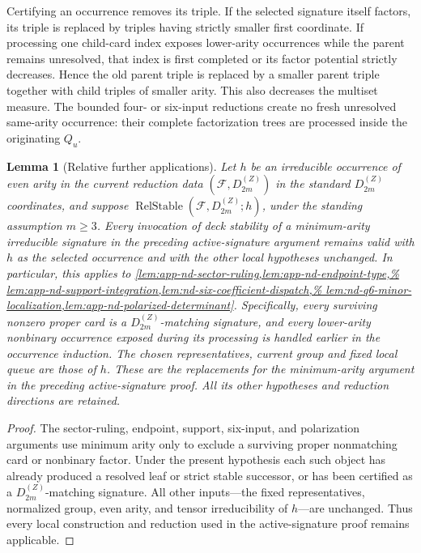 \documentclass[11pt,letterpaper,onecolumn]{article}
\theoremstyle{plain}
\newtheorem{lemma}[lemma]{Lemma}
\theoremstyle{definition}
\theoremstyle{remark}
\newcommand{\cF}{\mathcal F}
\newcommand{\DihZ}[1]{{D_{#1}^{(Z)}}}
\begin{document}
Certifying an occurrence removes its triple.  If the selected signature
itself factors, its triple is replaced by triples having strictly smaller
first coordinate.  If processing one child-card index exposes lower-arity
occurrences while the parent remains unresolved, that index is first completed
or its factor potential strictly decreases. Hence the old parent triple is
replaced by a smaller parent triple together with child triples of smaller
arity.  This also decreases the multiset measure.  The bounded four- or six-input reductions
create no fresh unresolved same-arity occurrence: their complete factorization trees are processed inside the originating \(Q_u\).

\begin{lemma}[Relative further applications]
\label{lem:nd-relative-reentry}
Let \(h\) be an irreducible occurrence of even arity in the current
reduction data \((\cF,\DihZ{2m})\) in the standard \(\DihZ{2m}\) coordinates, and suppose
\(\operatorname{RelStable}(\cF,\DihZ{2m};h)\), under the standing
assumption \(m\ge3\).  Every invocation of deck stability of a minimum-arity irreducible signature
in the preceding active-signature argument remains valid with \(h\) as the
selected occurrence and with the other local hypotheses unchanged.
In particular, this applies to
\cref{lem:app-nd-sector-ruling,lem:app-nd-endpoint-type,%
lem:app-nd-support-integration,lem:nd-six-coefficient-dispatch,%
lem:nd-q6-minor-localization,lem:app-nd-polarized-determinant}.
Specifically, every
surviving nonzero proper card is a \(\DihZ{2m}\)-matching signature, and
every lower-arity nonbinary occurrence exposed during its processing is
handled earlier in the occurrence induction.  The chosen representatives,
current group and fixed local queue are those of \(h\).  These are the
replacements for the minimum-arity argument in the preceding active-signature
proof. All its other hypotheses and reduction directions are retained.
\end{lemma}

\begin{proof}
The sector-ruling, endpoint, support, six-input, and polarization arguments
use minimum arity only to exclude a surviving proper nonmatching card or
nonbinary factor.  Under the present hypothesis each such object has
already produced a resolved leaf or strict stable successor, or has been
certified as a \(\DihZ{2m}\)-matching signature.  All other inputs---the
fixed representatives, normalized group, even arity, and tensor
irreducibility of \(h\)---are unchanged.  Thus every local construction and
reduction used in the active-signature proof remains applicable.
\end{proof}
\end{document}
